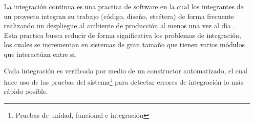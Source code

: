 La integración continua es una practica de software en la cual los integrantes
de un proyecto integran su trabajo (código, diseño, etcétera) de forma frecuente
realizando un despliegue al ambiente de producción al menos una vez al día
\cite{26_martin_fowler_ci}. Esta practica busca reducir de forma significativa los
problemas de integración, los cuales se incrementan en sistemas de gran tamaño
que tienen varios módulos que interactúan entre si.

Cada integración es verificada por medio de un constructor automatizado, el cual
hace uso de las pruebas del sistema\footnote{Pruebas de unidad, funcional e
  integración} para detectar errores de integración lo más rápido posible.
